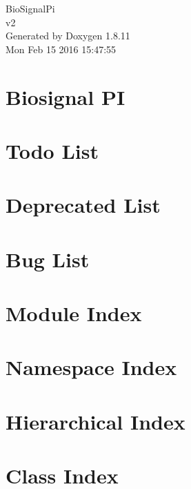 \documentclass[twoside]{book}
\newcommand{\+}{\discretionary{\mbox{\scriptsize$\hookleftarrow$}}{}{}}
\newcommand{\clearemptydoublepage}{%
  \newpage{\pagestyle{empty}\cleardoublepage}%
}
\begin{document}
\hypersetup{pageanchor=false,
             bookmarks=true,
             bookmarksnumbered=true,
             pdfencoding=unicode
            }
\begin{titlepage}
\vspace*{7cm}
\begin{center}%
{\Large Bio\+Signal\+Pi \\[1ex]\large v2 }\\
\vspace*{1cm}
{\large Generated by Doxygen 1.8.11}\\
\vspace*{0.5cm}
{\small Mon Feb 15 2016 15:47:55}\\
\end{center}
\end{titlepage}
\clearemptydoublepage
\tableofcontents
\clearemptydoublepage
{}
\hypersetup{pageanchor=true}

\chapter{Biosignal PI}
\label{index}\hypertarget{index}{}
\chapter{Todo List}
\label{todo}
\hypertarget{todo}{}

\chapter{Deprecated List}
\label{deprecated}
\hypertarget{deprecated}{}

\chapter{Bug List}
\label{bug}
\hypertarget{bug}{}

\chapter{Module Index}

\chapter{Namespace Index}

\chapter{Hierarchical Index}

\chapter{Class Index}

\end{document}
